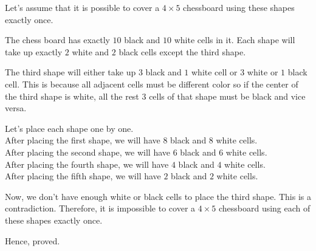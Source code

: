 \begin{solution}[a]
	Let's assume that it is possible to cover a $4 \times 5$ chessboard using these shapes exactly once.

	The chess board has exactly $10$ black and $10$ white cells in it. Each shape will take up exactly $2$ white and $2$ black cells except the third shape. 

	The third shape will either take up $3$ black and $1$ white cell or $3$ white or $1$ black cell. This is because all adjacent cells must be different color so if the center of the third shape is white, all the rest $3$ cells of that shape must be black and vice versa.

	Let's place each shape one by one. \\
	After placing the first shape, we will have $8$ black and $8$ white cells. \\
	After placing the second shape, we will have $6$ black and $6$ white cells. \\
	After placing the fourth shape, we will have $4$ black and $4$ white cells. \\
	After placing the fifth shape, we will have $2$ black and $2$ white cells.

	Now, we don't have enough white or black cells to place the third shape.
	This is a contradiction. Therefore, it is impossible to cover a $4 \times 5$ chessboard using each of these shapes exactly once.

	Hence, proved.
\end{solution}

